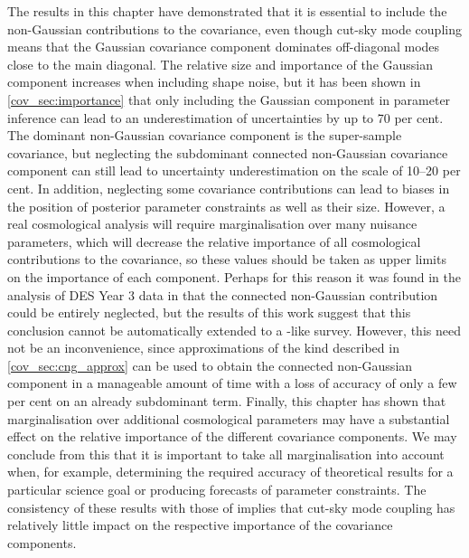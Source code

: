 The results in this chapter have demonstrated that it is essential to include the non-Gaussian contributions to the covariance, even though cut-sky mode coupling means that the Gaussian covariance component dominates off-diagonal modes close to the main diagonal. The relative size and importance of the Gaussian component increases when including shape noise, but it has been shown in \autoref{cov_sec:importance} that only including the Gaussian component in parameter inference can lead to an underestimation of uncertainties by up to 70 per cent. The dominant non-Gaussian covariance component is the super-sample covariance, but neglecting the subdominant connected non-Gaussian covariance component can still lead to uncertainty underestimation on the scale of 10--20 per cent.
In addition, neglecting some covariance contributions can lead to biases in the position of posterior parameter constraints as well as their size.
However, a real cosmological analysis will require marginalisation over many nuisance parameters, which will decrease the relative importance of all cosmological contributions to the covariance, so these values should be taken as upper limits on the importance of each component.
Perhaps for this reason it was found in the analysis of DES Year 3 data in \citet{Friedrich2021} that the connected non-Gaussian contribution could be entirely neglected, but the results of this work suggest that this conclusion cannot be automatically extended to a \Euclid{}-like survey.
However, this need not be an inconvenience, since approximations of the kind described in \autoref{cov_sec:cng_approx} can be used to obtain the connected non-Gaussian component in a manageable amount of time with a loss of accuracy of only a few per cent on an already subdominant term. Finally, this chapter has shown that marginalisation over additional cosmological parameters may have a substantial effect on the relative importance of the different covariance components. We may conclude from this that it is important to take all marginalisation into account when, for example, determining the required accuracy of theoretical results for a particular science goal or producing forecasts of parameter constraints.
The consistency of these results with those of \citet{Barreira2018b} implies that cut-sky mode coupling has relatively little impact on the respective importance of the covariance components.

% 
